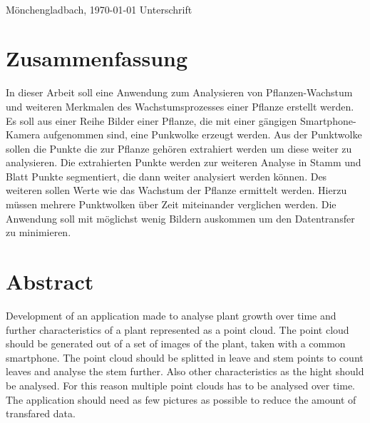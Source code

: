 \documentclass[12pt,titlepage, twoside]{article}
\begin{document}
\vspace{8ex}
\begin{tabbing}
\underline{\hspace{14em}} \hspace{3em}\= \underline{\hspace{14em}} \\
Mönchengladbach, \today \> Unterschrift
\end{tabbing}

\newpage
\section*{Zusammenfassung}
In dieser Arbeit soll eine Anwendung zum Analysieren von Pflanzen-Wachstum und weiteren Merkmalen des Wachstumsprozesses einer Pflanze erstellt werden. Es soll aus einer Reihe Bilder einer Pflanze, die mit einer gängigen Smartphone-Kamera aufgenommen sind, eine Punkwolke erzeugt werden. 
Aus der Punktwolke sollen die Punkte die zur Pflanze gehören extrahiert werden um diese weiter zu analysieren. Die extrahierten Punkte werden zur weiteren Analyse in Stamm und Blatt Punkte segmentiert, die dann weiter analysiert werden können.
Des weiteren sollen Werte wie das Wachstum der Pflanze ermittelt werden. Hierzu müssen mehrere Punktwolken über Zeit miteinander verglichen werden.
Die Anwendung soll mit möglichst wenig Bildern auskommen um den Datentransfer zu minimieren.

\setcounter{page}{1}
\section*{Abstract}
Development of an application made to analyse plant growth over time and further characteristics of a plant represented as a point cloud. The point cloud should be generated out of a set of images of the plant, taken with a common smartphone.
The point cloud should be splitted in leave and stem points to count leaves and analyse the stem further. Also other characteristics as the hight should be analysed. For this reason multiple point clouds has to be analysed over time.
The application should need as few pictures as possible to reduce the amount of transfared data.
\end{document}
